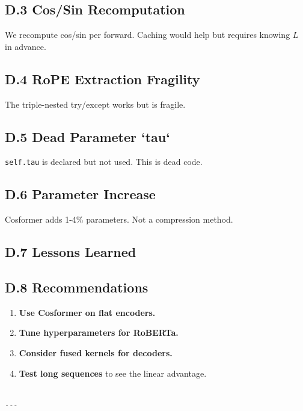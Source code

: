 \subsection{D.3 Cos/Sin Recomputation}

We recompute cos/sin per forward. Caching would help but requires knowing 
$L$ in advance.

\subsection{D.4 RoPE Extraction Fragility}

The triple-nested try/except works but is fragile.

\subsection{D.5 Dead Parameter `tau`}

\texttt{self.tau} is declared but not used. This is dead code.

\subsection{D.6 Parameter Increase}

Cosformer adds 1-4\% parameters. Not a compression method.

\subsection{D.7 Lessons Learned}

\subsection{D.8 Recommendations}

\begin{enumerate}
\item \textbf{Use Cosformer on flat encoders.}
\item \textbf{Tune hyperparameters for RoBERTa.}
\item \textbf{Consider fused kernels for decoders.}
\item \textbf{Test long sequences} to see the linear advantage.
\end{enumerate}
\begin{lstlisting}

---
\end{lstlisting}